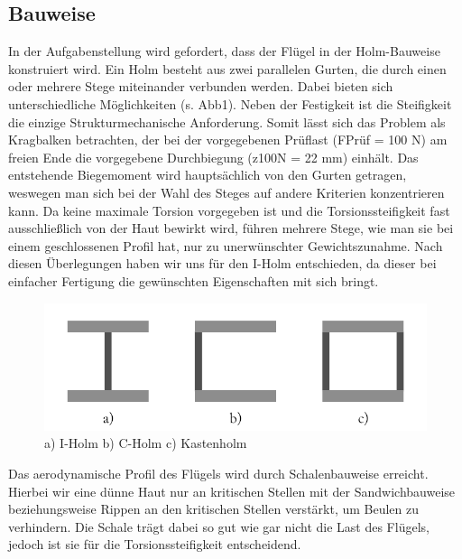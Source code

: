\subsection{Bauweise}
In der Aufgabenstellung wird gefordert, dass der Flügel in der Holm-Bauweise konstruiert wird. Ein Holm besteht aus zwei parallelen Gurten, die durch einen oder mehrere Stege miteinander verbunden werden. Dabei bieten sich unterschiedliche Möglichkeiten (s. Abb1). Neben der Festigkeit ist die Steifigkeit die einzige Strukturmechanische Anforderung. Somit lässt sich das Problem als Kragbalken betrachten, der bei der vorgegebenen Prüflast (FPrüf = 100 N) am freien Ende die vorgegebene Durchbiegung (z100N = 22 mm) einhält. Das entstehende Biegemoment wird hauptsächlich von den Gurten getragen, weswegen man sich bei der Wahl des Steges auf andere Kriterien konzentrieren kann. Da keine maximale Torsion vorgegeben ist und die Torsionssteifigkeit fast ausschließlich von der Haut bewirkt wird, führen mehrere Stege, wie man sie bei einem geschlossenen Profil hat, nur zu unerwünschter Gewichtszunahme. Nach diesen Überlegungen haben wir uns für den I-Holm entschieden, da dieser bei einfacher Fertigung die gewünschten Eigenschaften mit sich bringt.
\begin{figure}
	\includegraphics[width=1.0\textwidth]{Bilder/Holmarten.png}
	\caption{a) I-Holm   b) C-Holm    c) Kastenholm}
	\label{fig: Holmarten}
\end{figure} 
Das aerodynamische Profil des Flügels wird durch Schalenbauweise erreicht. Hierbei wir eine dünne Haut nur an kritischen Stellen mit der Sandwichbauweise beziehungsweise Rippen an den kritischen Stellen verstärkt, um Beulen zu verhindern. Die Schale trägt dabei so gut wie gar nicht die Last des Flügels, jedoch ist sie für die Torsionssteifigkeit entscheidend.
